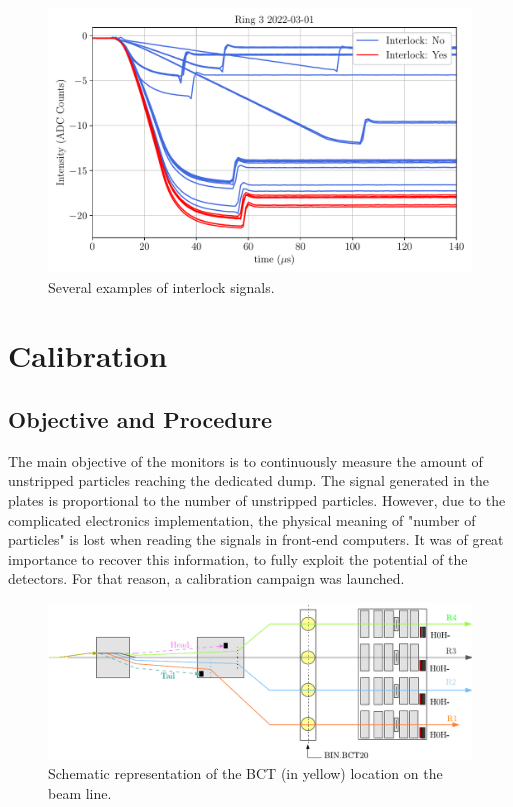 \begin{figure}[h]
    \centering
    \includegraphics[width=0.7\columnwidth]{Figure_InterlockSignal/InterlockSignal.pdf}
    \caption{Several examples of interlock signals.}
    \label{fig:InterlockSignal}
\end{figure}

\section{Calibration}

\subsection{Objective and Procedure}

The main objective of the \hzhm monitors is to continuously measure the amount of unstripped particles reaching the dedicated dump. The signal generated in the plates is proportional to the number of unstripped particles. However, due to the complicated electronics implementation, the physical meaning of "number of particles" is lost when reading the signals in front-end computers. It was of great importance to recover this information, to fully exploit the potential of the detectors. For that reason, a calibration campaign was launched. 

\begin{figure}[h]
    \centering
    \includegraphics[width=1.0\columnwidth]{Figure_BCTPosition/BctPosSim.pdf}
    \caption{Schematic representation of the BCT (in yellow) location on the beam line. }
    \label{fig:LocationBCTPlate}
\end{figure}

